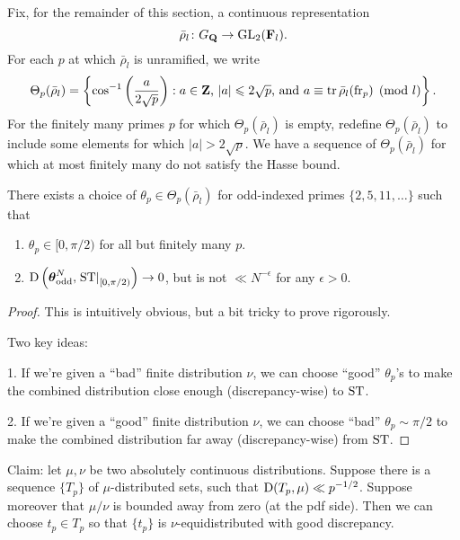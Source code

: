 Fix, for the remainder of this section, a continuous representation 
\[
	\bar\rho_l \colon G_{\mathbf{Q}} \to \operatorname{GL}_2(\mathbf{F}_l) .
\]
For each $p$ at which $\bar\rho_l$ is unramified, we write 
\[
	\Theta_p(\bar\rho_l) = \left\{\cos^{-1}\left(\frac{a}{2\sqrt p}\right) : a\in \mathbf{Z}\text{, }|a|\leqslant 2\sqrt p\text{, and }a\equiv \operatorname{tr}\bar\rho_l(\mathrm{fr}_p)\pmod l\right\} .
\]
For the finitely many primes $p$ for which $\Theta_p(\bar\rho_l)$ is empty, 
redefine $\Theta_p(\bar\rho_l)$ to include some elements for which 
$|a|>2\sqrt p$. We have a sequence of $\Theta_p(\bar\rho_l)$ for which at most 
finitely many do not satisfy the Hasse bound. 

\begin{theorem}
There exists a choice of $\theta_p\in \Theta_p(\bar\rho_l)$ for odd-indexed 
primes $\{2,5,11,\dots\}$ such that 
\begin{enumerate}
\item
$\theta_p\in [0,\pi/2)$ for all but finitely many $p$. 

\item
$\operatorname{D}\left({\boldsymbol\theta}_{\mathrm{odd}}^N, \left.\mathrm{ST}\right|_{[0,\pi/2)}\right) \to 0$, 
but is not $\ll N^{-\epsilon}$ for any $\epsilon>0$. 
\end{enumerate}
\end{theorem}
\begin{proof}
This is intuitively obvious, but a bit tricky to prove rigorously. 

Two key ideas: 

1. If we're given a ``bad'' finite distribution $\nu$, we can choose ``good'' 
$\theta_p$'s to make the combined distribution close enough (discrepancy-wise) 
to $\mathrm{ST}$. 

2. If we're given a ``good'' finite distribution $\nu$, we can choose ``bad'' 
$\theta_p\sim \pi/2$ to make the combined distribution far away 
(discrepancy-wise) from $\mathrm{ST}$. 
\end{proof}

Claim: let $\mu,\nu$ be two absolutely continuous distributions. Suppose there 
is a sequence $\{T_p\}$ of $\mu$-distributed sets, such that 
$\operatorname{D}(T_p,\mu) \ll p^{-1/2}$. Suppose moreover that $\mu/\nu$ is bounded away 
from zero (at the pdf side). Then we can choose $t_p\in T_p$ so that 
$\{t_p\}$ is $\nu$-equidistributed with good discrepancy. 

